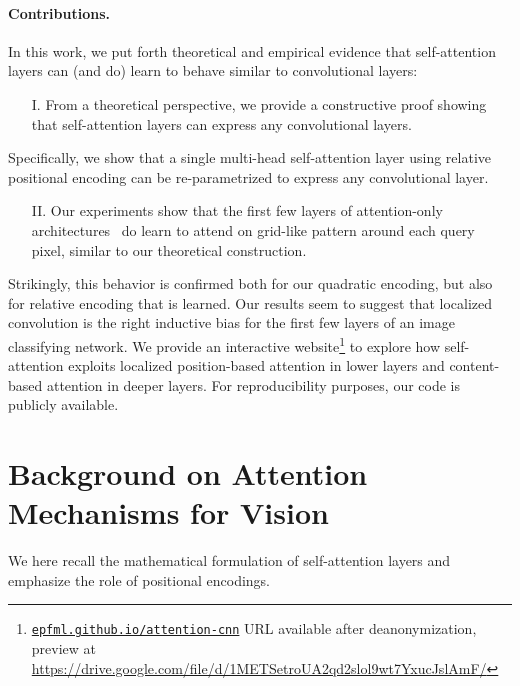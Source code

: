 \documentclass{article} \usepackage{iclr2020_conference,times}
\newcommand{\interactiveurl}{\href{https://epfml.github.io/attention-cnn}{\tt epfml.github.io/attention-cnn}}
\begin{document}
\paragraph{Contributions.}
In this work, we put forth theoretical and empirical evidence that self-attention layers can (and do) learn to behave similar to convolutional layers:
\vspace{-2mm}
\begin{itemize}
\item[I.] From a theoretical perspective, we provide a constructive proof showing that self-attention layers can express any convolutional layers.
\end{itemize}
\vspace{-2mm}
Specifically, we show that a single multi-head self-attention layer using relative positional encoding can be re-parametrized to express any convolutional layer. \vspace{-2mm}
\begin{itemize}
\item[II.] Our experiments show that the first few layers of attention-only architectures~\citep{ramachandran2019standaloneselfattention} do learn to attend on grid-like pattern around each query pixel, similar to our theoretical construction.
\end{itemize}
Strikingly, this behavior is confirmed both for our quadratic encoding, but also for relative encoding that is learned.
Our results seem to suggest that localized convolution is the right inductive bias for the first few layers of an image classifying network.
We provide an interactive website\footnote{\ificlrfinal \interactiveurl{} \else URL available after deanonymization, preview at \url{https://drive.google.com/file/d/1METSetroUA2qd2slol9wt7YxucJslAmF/} \fi} to explore how self-attention exploits localized position-based attention in lower layers and content-based attention in deeper layers.
For reproducibility purposes, our code is publicly available. 

\section{Background on Attention Mechanisms for Vision}
\label{sec:background}

We here recall the mathematical formulation of self-attention layers and emphasize the role of positional encodings.
\end{document}
